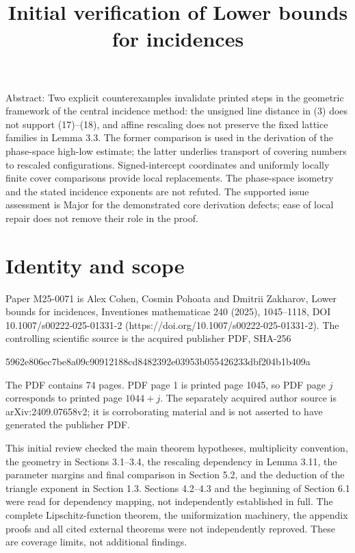 \documentclass[10pt]{article}
\title{Initial verification of
Lower bounds for incidences}
\author{}
\date{}
\begin{document}
\maketitle
Abstract: Two explicit counterexamples invalidate printed steps in the geometric framework of the central incidence method: the unsigned line distance in (3) does not support (17)–(18), and affine rescaling does not preserve the fixed lattice families in Lemma 3.3. The former comparison is used in the derivation of the phase-space high-low estimate; the latter underlies transport of covering numbers to rescaled configurations. Signed-intercept coordinates and uniformly locally finite cover comparisons provide local replacements. The phase-space isometry and the stated incidence exponents are not refuted. The supported issue assessment is Major for the demonstrated core derivation defects; ease of local repair does not remove their role in the proof.\par
\section*{Identity and scope}
Paper M25-0071 is Alex Cohen, Cosmin Pohoata and Dmitrii Zakharov, Lower bounds for incidences, Inventiones mathematicae 240 (2025), 1045–1118, DOI 10.1007/s00222-025-01331-2 (https://doi.org/10.1007/s00222-025-01331-2). The controlling scientific source is the acquired publisher PDF, SHA-256\par
5962e806ec7be8a09c90912188cd8482392e03953b055426233dbf204b1b409a\par
The PDF contains 74 pages. PDF page 1 is printed page 1045, so PDF page \(j\) corresponds to printed page \(1044+j\). The separately acquired author source is arXiv:2409.07658v2; it is corroborating material and is not asserted to have generated the publisher PDF.\par
This initial review checked the main theorem hypotheses, multiplicity convention, the geometry in Sections 3.1–3.4, the rescaling dependency in Lemma 3.11, the parameter margins and final comparison in Section 5.2, and the deduction of the triangle exponent in Section 1.3. Sections 4.2–4.3 and the beginning of Section 6.1 were read for dependency mapping, not independently established in full. The complete Lipschitz-function theorem, the uniformization machinery, the appendix proofs and all cited external theorems were not independently reproved. These are coverage limits, not additional findings.\par
\end{document}
